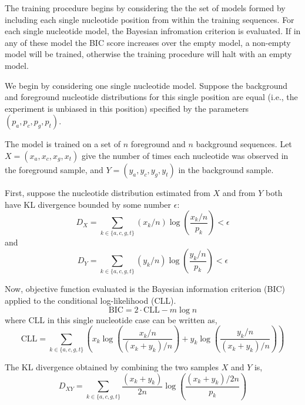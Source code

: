 \documentclass[letterpaper]{article}
\begin{document}
The training procedure begins by considering the the set of models formed by
including each single nucleotide position from within the training sequences.
For each single nucleotide model, the Bayesian infromation criterion is evaluated. If in any of these
model the BIC score increases over the empty model, a non-empty model will be
trained, otherwise the training procedure will halt with an empty model.

We begin by considering one single nucleotide model. Suppose the background and
foreground nucleotide distributions for this single position are equal (i.e.,
the experiment is unbiased in this position) specified by the parameters $(p_{a}, p_{c},
p_{g}, p_{t})$.

The model is trained on a set of $n$ foreground and $n$ background sequences.
Let $X = (x_{a}, x_{c}, x_{g}, x_{t})$ give the number of times each nucleotide
was observed in the foreground sample, and $Y = (y_{a}, y_{c}, y_{g}, y_{t})$
in the background sample.

First, suppose the nucleotide distribution estimated from $X$ and from $Y$ both
have KL divergence bounded by some number $\epsilon$:
$$ D_{X} = \sum_{k \in \{a, c, g, t\}} (x_k / n) \log \left( \frac{x_k / n}{p_k}
\right) < \epsilon $$
and
$$ D_{Y} = \sum_{k \in \{a, c, g, t\}} (y_k / n) \log \left( \frac{y_k / n}{p_k}
\right) < \epsilon $$

Now, objective function evaluated is the Bayesian information criterion (BIC)
applied to the conditional log-likelihood (CLL).
$$ \text{BIC} = 2 \cdot \text{CLL} - m \log n $$
where CLL in this single nucleotide case can be written as,
$$ \text{CLL} =
\sum_{k \in \{a, c, g, t\}}
\left(
x_k \log \left( \frac{x_k/n}{(x_k + y_k)/n} \right) +
y_k \log \left( \frac{y_k/n}{(x_k + y_k)/n} \right) \right)$$

The KL divergence obtained by combining the two samples $X$ and $Y$ is,
$$D_{XY} = \sum_{k \in \{a, c, g, t\}}
\frac{(x_k + y_k)}{2n}
\log \left( \frac{(x_k + y_k)/2n}{p_k} \right)$$
\end{document}
